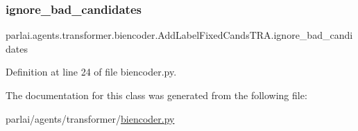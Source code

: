 \subsubsection{\texorpdfstring{ignore\+\_\+bad\+\_\+candidates}{ignore\_bad\_candidates}}
{\footnotesize\ttfamily parlai.\+agents.\+transformer.\+biencoder.\+Add\+Label\+Fixed\+Cands\+T\+R\+A.\+ignore\+\_\+bad\+\_\+candidates}



Definition at line 24 of file biencoder.\+py.



The documentation for this class was generated from the following file\+:\begin{DoxyCompactItemize}
\item 
parlai/agents/transformer/\hyperlink{biencoder_8py}{biencoder.\+py}\end{DoxyCompactItemize}
